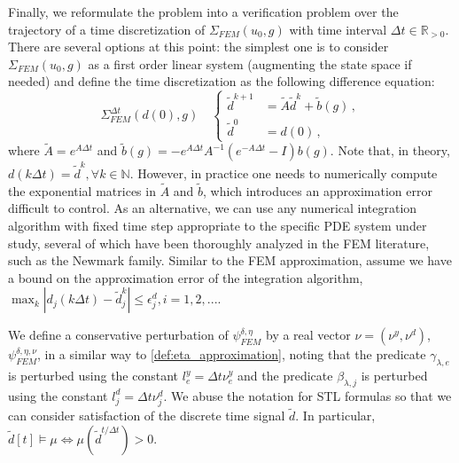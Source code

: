 \documentclass[letterpaper, 10 pt, conference]{ieeeconf/ieeeconf}
\newcommand*{\R}{\mathbb{R}}
\newcommand*{\N}{\mathbb{N}}
\newcommand{\Always}{\mathbf{G}}
\begin{document}
Finally, we reformulate the problem into a verification problem over the
trajectory of a time discretization of $\Sigma_{FEM}(u_0, g)$ with time interval $\Delta
t \in \R_{>0}$. There are several options at this point: the simplest one is to
consider $\Sigma_{FEM}(u_0, g)$ as a first order linear system (augmenting the state
space if needed) and define the time discretization as the following difference
equation:
%
\begin{equation}
    \label{eq:disc_system}
    \Sigma_{FEM}^{\Delta t}(d(0), g) \quad \left\{
    \begin{aligned}
        \tilde d^{k+1} &= \tilde A \tilde d^k + \tilde b(g) \,, \\
        \tilde d^0 &= d(0) \,,
    \end{aligned}
    \right.
\end{equation}
%
where $\tilde A = e^{A \Delta t}$ and $\tilde b(g) = - e^{A \Delta t} A^{-1} 
( e^{- A \Delta t} - I ) b(g)$. Note that, in theory, $d(k \Delta t) = \tilde d^k,
\forall k \in \N$. However, in practice one needs to numerically compute the
exponential matrices in $\tilde A$ and $\tilde b$, which introduces an
approximation error difficult to control. As an alternative, we can use any
numerical integration algorithm with fixed time step appropriate to the specific
PDE system under study, several of which have been
thoroughly analyzed in the FEM literature, such as the Newmark family. Similar
to the FEM approximation, assume we have a bound on the approximation error of
the integration algorithm, $\max_k |d_j(k \Delta t) - \tilde d^k_j| \leq
\epsilon^d_j, i=1,2,...$.

We define a conservative perturbation of $\psi^{\delta, \eta}_{FEM}$ by a real
vector $\nu = (\nu^y, \nu^d)$, $\psi^{\delta, \eta, \nu}_{FEM}$, in a similar
way to \cref{def:eta_approximation}, noting that the predicate $\gamma_{\lambda, e}$ is perturbed
using the constant $l_e^y = \Delta t \nu^y_e$ and the predicate $\beta_{\lambda, j}$ is
perturbed using the constant $l_j^d = \Delta t \nu^d_j$. We abuse the notation
for STL formulas so that we can consider satisfaction of the discrete time
signal $\tilde{d}$. In particular, $\tilde{d}[t] \models \mu \iff
\mu(\tilde{d}^{t / \Delta t}) > 0$.
\end{document}

